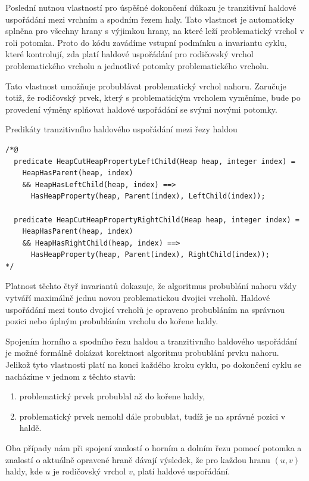 Poslední nutnou vlastností pro úspěšné dokončení důkazu je tranzitivní haldové uspořádání mezi vrchním a spodním řezem haly. Tato vlastnost je automaticky splněna pro všechny hrany s výjimkou hrany, na které leží problematický vrchol v roli potomka. Proto do kódu zavádíme vstupní podmínku a invariantu cyklu, které kontrolují, zda platí haldové uspořádání pro rodičovský vrchol problematického vrcholu a jednotlivé potomky problematického vrcholu.

Tato vlastnost umožňuje probublávat problematický vrchol nahoru. Zaručuje totiž, že rodičovský prvek, který s problematickým vrcholem vyměníme, bude po provedení výměny splňovat haldové uspořádání se svými novými potomky.

\begin{listing}[H]
	\caption{Predikáty tranzitivního haldového uspořádání mezi řezy haldou}
	\begin{verbatim}
/*@
  predicate HeapCutHeapPropertyLeftChild(Heap heap, integer index) = 
    HeapHasParent(heap, index)
    && HeapHasLeftChild(heap, index) ==>
      HasHeapProperty(heap, Parent(index), LeftChild(index));

  predicate HeapCutHeapPropertyRightChild(Heap heap, integer index) =
    HeapHasParent(heap, index)
    && HeapHasRightChild(heap, index) ==>
      HasHeapProperty(heap, Parent(index), RightChild(index));
*/
	\end{verbatim}
\end{listing}

Platnost těchto čtyř invariantů dokazuje, že algoritmus probublání nahoru vždy vytváří maximálně jednu novou problematickou dvojici vrcholů. Haldové uspořádání mezi touto dvojicí vrcholů je opraveno probubláním na správnou pozici nebo úplným probubláním vrcholu do kořene haldy.

Spojením horního a spodního řezu haldou a tranzitivního haldového uspořádání je možné formálně dokázat korektnost algoritmu probublání prvku nahoru. Jelikož tyto vlastnosti platí na konci každého kroku cyklu, po dokončení cyklu se nacházíme v jednom z těchto stavů:

\begin{enumerate}
  \item problematický prvek probublal až do kořene haldy,
  \item problematický prvek nemohl dále probublat, tudíž je na správné pozici v haldě.
\end{enumerate}

Oba případy nám při spojení znalostí o horním a dolním řezu pomocí potomka a znalostí o aktuálně opravené hraně dávají výsledek, že pro každou hranu $(u, v)$ haldy, kde $u$ je rodičovský vrchol $v$, platí haldové uspořádání.

